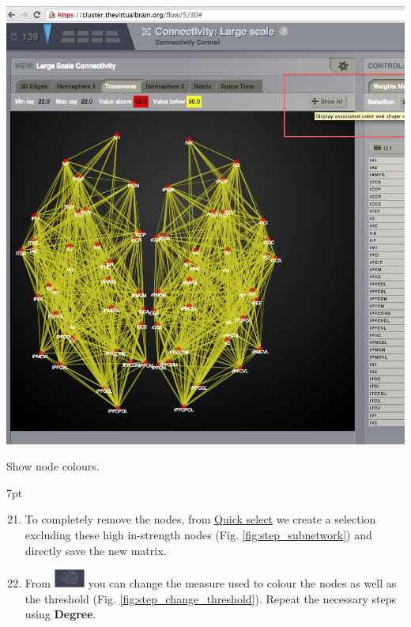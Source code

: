 \documentclass{tufte-handout}
\newenvironment{formal}{%
  \def\FrameCommand{%
    \hspace{1pt}%
    {\color{DarkBlue}\vrule width 2pt}%
    {\color{formalshade}\vrule width 4pt}%
    \colorbox{formalshade}%
  }%
  \MakeFramed{\advance\hsize-\width\FrameRestore}%
  \noindent\hspace{-4.55pt}%
  \begin{adjustwidth}{}{7pt}%
  \vspace{2pt}\vspace{2pt}%
}
{%
  \vspace{2pt}\end{adjustwidth}\endMakeFramed%
}
\begin{document}
\begin{marginfigure}
  \includegraphics[width=0.9\linewidth]{Handout_UI_ModellingStructuralLesions_ShowColourNodes}%
  \caption{Show node colours.}%
  \label{fig:step_12}%
\end{marginfigure}

\begin{formal}
  \begin{enumerate}[resume] %
  \setcounter{enumi}{20}
\item To completely remove the nodes, from \underline{Quick select} we create a selection excluding these high in-strength nodes (Fig. \ref{fig:step_subnetwork}) and directly save the new matrix. 
\item From \includegraphics[width=0.08\textwidth]{butt_brain_menu} 
 you can change the measure used to colour the nodes as well as the threshold  (Fig. \ref{fig:step_change_threshold}). Repeat the necessary steps using \textbf{Degree}. 

  \end{enumerate}
\end{formal}
\end{document}

